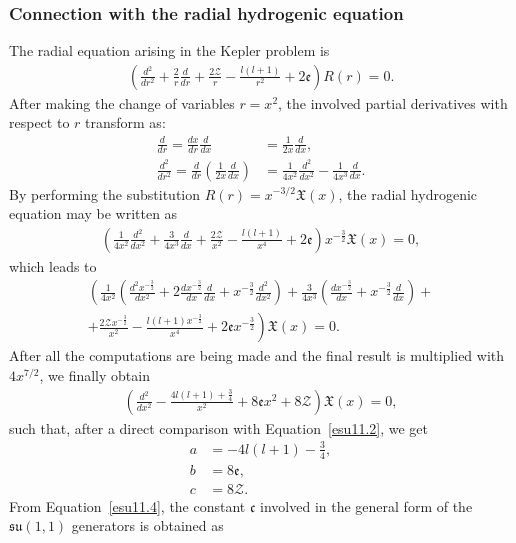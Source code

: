 \documentclass[12pt,a4paper]{report}
\theoremstyle{definition}
\theoremstyle{remark}
\theoremstyle{remark}
\begin{document}
\subsubsection{Connection with the radial hydrogenic equation}
The radial equation arising in the Kepler problem is
\begin{align*}
\left(\frac{d^2}{dr^2}+\frac{2}{r}\frac{d}{dr}+\frac{2\mathcal{Z}}{r}-\frac{l(l+1)}{r^2}+2\mathfrak{e}\right)R(r)=0.
\end{align*}
After making the change of variables $r=x^2$, the involved partial derivatives with respect to $r$ transform as:\
\begin{align*}
\frac{d}{dr}=\frac{dx}{dr}\frac{d}{dx}&=\frac{1}{2x}\frac{d}{dx}, \\
\frac{d^2}{dr^2}=\frac{d}{dr}\left(\frac{1}{2x}\frac{d}{dx}\right)&=\frac{1}{4x^2}\frac{d^2}{dx^2}-\frac{1}{4x^3}\frac{d}{dx}.
\end{align*}
By performing the substitution $R(r)=x^{-3/2}\mathfrak{X}(x)$, the radial hydrogenic equation may be written as
\begin{align*}
\left(\frac{1}{4x^2}\frac{d^2}{dx^2}+\frac{3}{4x^3}\frac{d}{dx}+\frac{2\mathcal{Z}}{x^2}-\frac{l(l+1)}{x^4}+2\mathfrak{e}\right)x^{-\frac{3}{2}}\mathfrak{X}(x)=0,
\end{align*}
which leads to
\begin{align*}
\left(\frac{1}{4x^2}\left(\frac{d^2x^{-\frac{3}{2}}}{dx^2}+2\frac{dx^{-\frac{3}{2}}}{dx}\frac{d}{dx}+x^{-\frac{3}{2}}\frac{d^2}{dx^2}\right)+\frac{3}{4x^3}\left(\frac{dx^{-\frac{3}{2}}}{dx}+x^{-\frac{3}{2}}\frac{d}{dx}\right)+\right.\\
+\left.\frac{2\mathcal{Z}x^{-\frac{3}{2}}}{x^2}-\frac{l(l+1)x^{-\frac{3}{2}}}{x^4}+2\mathfrak{e}x^{-\frac{3}{2}}\right)\mathfrak{X}(x)=0.
\end{align*}
After all the computations are being made and the final result is multiplied with $4x^{7/2}$, we finally obtain
\begin{align*}
\left(\frac{d^2}{dx^2}-\frac{4l(l+1)+\frac{3}{4}}{x^2}+8\mathfrak{e}x^2+8\mathcal{Z}\right)\mathfrak{X}(x)=0,
\end{align*}
such that, after a direct comparison with Equation~\ref{esu11.2}, we get
\begin{align*}
a&= -4l(l+1)-\frac{3}{4},\\
b&= 8\mathfrak{e},\\
c&= 8\mathcal{Z}.
\end{align*}
From Equation~\ref{esu11.4}, the constant $\mathfrak{c}$ involved in the general form of the $\mathfrak{su}(1,1)$ generators is obtained as
\end{document}

